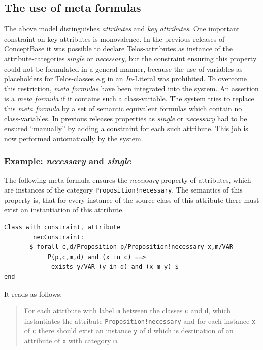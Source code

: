 \subsection{The use of meta formulas}
The above model distinguishes {\em attributes} and {\em key attri\-butes}.
One important constraint on key attributes is monovalence.
In the previous releases of ConceptBase it was possible to declare
Telos-attributes as instance of the attribute-categories {\em single} or
{\em necessary}, but the constraint ensuring this property could not be
formulated in a general manner, because the use of variables as
placeholders for Telos-classes e.g in an {\em In}-Literal was prohibited.
 To overcome this restriction, {\em meta formulas}
have been integrated into the system. An assertion is a {\em meta formula} if
it contains such a class-variable. The system tries to replace this
{\em meta formula} by a set of semantic equivalent formulas which contain
no class-variables. In previous releases properties as
{\em single} or {\em necessary} had to be  ensured ``manually'' by adding a
constraint for each such attribute.  This job is now performed automatically
by the system.

\subsubsection{Example: {\em necessary} and {\em single}}
The following meta formula ensures the {\em necessary} property of attributes,
which are instances of the category {\tt Proposition!necessary}. The semantics of
this property is, that for every instance of the source class of this
attribute there must exist an instantiation of this attribute.

{\small
\begin{verbatim}
Class with constraint, attribute
        necConstraint:
       $ forall c,d/Proposition p/Proposition!necessary x,m/VAR
            P(p,c,m,d) and (x in c) ==>
             exists y/VAR (y in d) and (x m y) $
end
\end{verbatim}
}

It reads as follows:\\

\begin{quote}
For each attribute with label {\tt m} between the classes {\tt c} and
{\tt d}, which instantiates the attribute {\tt Proposition!necessary} and for each
instance {\tt x} of {\tt c} there should exist an instance {\tt y}
of {\tt d} which is destination of an attribute of {\tt x} with category {\tt m}.
\end{quote}

